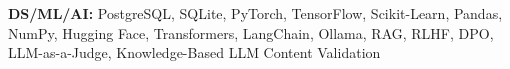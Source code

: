 \textbf{DS/ML/AI:} PostgreSQL, SQLite, PyTorch, TensorFlow, Scikit-Learn, Pandas, NumPy, Hugging Face, Transformers, LangChain, Ollama, RAG, RLHF, DPO, LLM-as-a-Judge, Knowledge-Based LLM Content Validation

